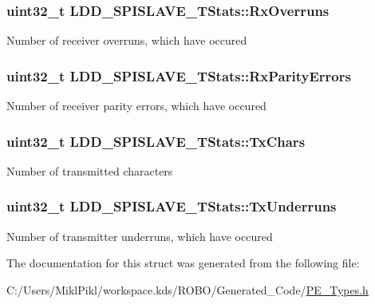\subsubsection[{Rx\+Overruns}]{\setlength{\rightskip}{0pt plus 5cm}uint32\+\_\+t L\+D\+D\+\_\+\+S\+P\+I\+S\+L\+A\+V\+E\+\_\+\+T\+Stats\+::\+Rx\+Overruns}\label{struct_l_d_d___s_p_i_s_l_a_v_e___t_stats_a82edd5dc5e18e7cd6a047d0efbda97ae}
Number of receiver overruns, which have occured \hypertarget{struct_l_d_d___s_p_i_s_l_a_v_e___t_stats_abef442625b92cf52c2ff04edf6894dd3}{}
\subsubsection[{Rx\+Parity\+Errors}]{\setlength{\rightskip}{0pt plus 5cm}uint32\+\_\+t L\+D\+D\+\_\+\+S\+P\+I\+S\+L\+A\+V\+E\+\_\+\+T\+Stats\+::\+Rx\+Parity\+Errors}\label{struct_l_d_d___s_p_i_s_l_a_v_e___t_stats_abef442625b92cf52c2ff04edf6894dd3}
Number of receiver parity errors, which have occured \hypertarget{struct_l_d_d___s_p_i_s_l_a_v_e___t_stats_ab674ba50318e198a1ee9dea0692ce239}{}
\subsubsection[{Tx\+Chars}]{\setlength{\rightskip}{0pt plus 5cm}uint32\+\_\+t L\+D\+D\+\_\+\+S\+P\+I\+S\+L\+A\+V\+E\+\_\+\+T\+Stats\+::\+Tx\+Chars}\label{struct_l_d_d___s_p_i_s_l_a_v_e___t_stats_ab674ba50318e198a1ee9dea0692ce239}
Number of transmitted characters \hypertarget{struct_l_d_d___s_p_i_s_l_a_v_e___t_stats_ab2e5342f4a486b20ae9306f451451a77}{}
\subsubsection[{Tx\+Underruns}]{\setlength{\rightskip}{0pt plus 5cm}uint32\+\_\+t L\+D\+D\+\_\+\+S\+P\+I\+S\+L\+A\+V\+E\+\_\+\+T\+Stats\+::\+Tx\+Underruns}\label{struct_l_d_d___s_p_i_s_l_a_v_e___t_stats_ab2e5342f4a486b20ae9306f451451a77}
Number of transmitter underruns, which have occured 

The documentation for this struct was generated from the following file\+:\begin{DoxyCompactItemize}
\item 
C\+:/\+Users/\+Mikl\+Pikl/workspace.\+kds/\+R\+O\+B\+O/\+Generated\+\_\+\+Code/\hyperlink{_p_e___types_8h}{P\+E\+\_\+\+Types.\+h}\end{DoxyCompactItemize}
